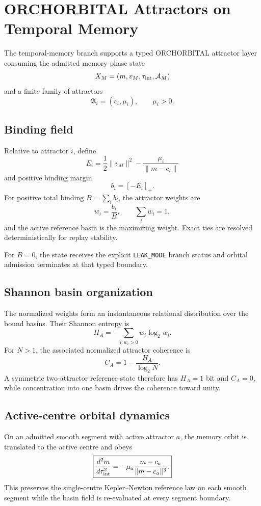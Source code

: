 \chapter{ORCHORBITAL Attractors on Temporal Memory}

The temporal-memory branch supports a typed ORCHORBITAL attractor layer consuming the admitted memory phase state
\[
X_M=(m,v_M,\tau_{\rm int},\mathcal A_M)
\]
and a finite family of attractors
\[
\mathfrak A_i=(c_i,\mu_i),
\qquad \mu_i>0.
\]

\section{Binding field}

Relative to attractor \(i\), define
\[
\boxed{
E_i=\frac12\|v_M\|^2-\frac{\mu_i}{\|m-c_i\|}
}
\]
and positive binding margin
\[
\boxed{b_i=[-E_i]_+.}
\]
For positive total binding \(B=\sum_i b_i\), the attractor weights are
\[
\boxed{w_i=\frac{b_i}{B}},
\qquad
\sum_iw_i=1,
\]
and the active reference basin is the maximizing weight. Exact ties are resolved deterministically for replay stability.

For \(B=0\), the state receives the explicit \texttt{LEAK\_MODE} branch status and orbital admission terminates at that typed boundary.

\section{Shannon basin organization}

The normalized weights form an instantaneous relational distribution over the bound basins. Their Shannon entropy is
\[
\boxed{
H_A=-\sum_{i:w_i>0}w_i\log_2w_i.
}
\]
For \(N>1\), the associated normalized attractor coherence is
\[
\boxed{
C_A=1-\frac{H_A}{\log_2N}.
}
\]
A symmetric two-attractor reference state therefore has \(H_A=1\) bit and \(C_A=0\), while concentration into one basin drives the coherence toward unity.

\section{Active-centre orbital dynamics}

On an admitted smooth segment with active attractor \(a\), the memory orbit is translated to the active centre and obeys
\[
\boxed{
\frac{d^2m}{d\tau_{\rm int}^2}
=-\mu_a\frac{m-c_a}{\|m-c_a\|^3}.
}
\]
This preserves the single-centre Kepler--Newton reference law on each smooth segment while the basin field is re-evaluated at every segment boundary.

